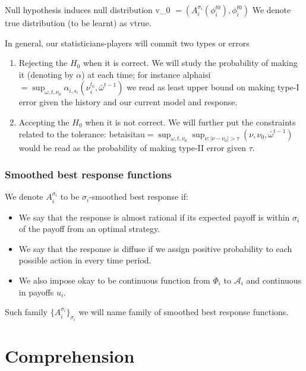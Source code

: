 \documentclass[]{spie}  %
\begin{document}
Null hypothesis induces null distribution \gls{v_0} $ = (A_i^{\sigma_i}(\phi_i^{t0}), \phi_i^{t0})$
We denote true distribution (to be learnt) as \gls{vtrue}.

In general, our statisticians-players will commit two types or errors
\begin{enumerate}[I]
    \item Rejecting the $H_0$ when it is correct. We will study the probability of making it (denoting by $\alpha$) at each time; for instance \gls{alphaisi}$= \sup_{\omega,t,\nu_0} \alpha_{i,s_i}(\nu_i^{t_0}, \bar{\omega}^{t-1})$ we read as least upper bound on making type-I error given the history and our current model and response.
    \item Accepting the $H_0$ when it is not correct. We will further put the constraints related to the tolerance: \gls{betaisitau}$=\sup_{\omega, t, \nu_0} \sup_{\nu: \lvert \nu-\nu_0 \rvert > \tau} (\nu, \nu_0, \bar{\omega}^{t-1})$ would be read as the probability of making type-II error given $\tau$.
\end{enumerate}

\subsubsection{Smoothed best response functions}
\label{sec:smooth}
We denote $A_i^{\sigma_i}$ to be $\sigma_i$-smoothed best response if:
\begin{itemize}
    \item We say that the response is almost rational if its expected payoff is within $\sigma_i$ of the payoff from an optimal strategy. 
    \item We say that the response is diffuse if we assign positive probability to each possible action in every time period.
    \item We also impose \gls{okay} to be continuous function from $\Phi_i$ to $\mathcal{A}_i$ and continuous in payoffs $u_i$.
\end{itemize}

Such family $\{ A_i^{\sigma_i} \}_{\sigma_i}$ we will name family of smoothed best response functions.

\newpage
\section{Comprehension}
\label{sec:main}
\end{document}
